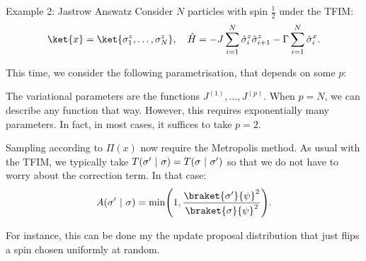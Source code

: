 \documentclass[a4paper]{article}
\begin{document}
\begin{parag}{Example 2: Jastrow Answatz}
    Consider $N$ particles with spin $\frac{1}{2}$ under the TFIM: 
    \[\ket{x} = \ket{\sigma_1^z, \ldots, \sigma_N^z}, \mathspace \hat{H} = -J \sum_{i=1}^{N} \hat{\sigma}_i^z \hat{\sigma}_{i+1}^z - \Gamma \sum_{i=1}^{N} \hat{\sigma}_i^x.\]

    This time, we consider the following parametrisation, that depends on some $p$:

    The variational parameters are the functions $J^{\left(1\right)}, \ldots, J^{\left(p\right)}$. When $p = N$, we can describe any function that way. However, this requires exponentially many parameters. In fact, in most cases, it suffices to take $p = 2$.

    Sampling according to $\Pi\left(x\right)$ now require the Metropolis method. As usual with the TFIM, we typically take $T\left(\sigma' \suchthat \sigma\right) = T\left(\sigma \suchthat \sigma'\right)$ so that we do not have to worry about the correction term. In that case:
    \[A\left(\sigma' \suchthat \sigma\right) = \min\left(1, \frac{\braket{\sigma'}{\psi}^2}{\braket{\sigma}{\psi}^2}\right).\]

    For instance, this can be done my the update proposal distribution that just flips a spin chosen uniformly at random.
\end{parag}
\end{document}

